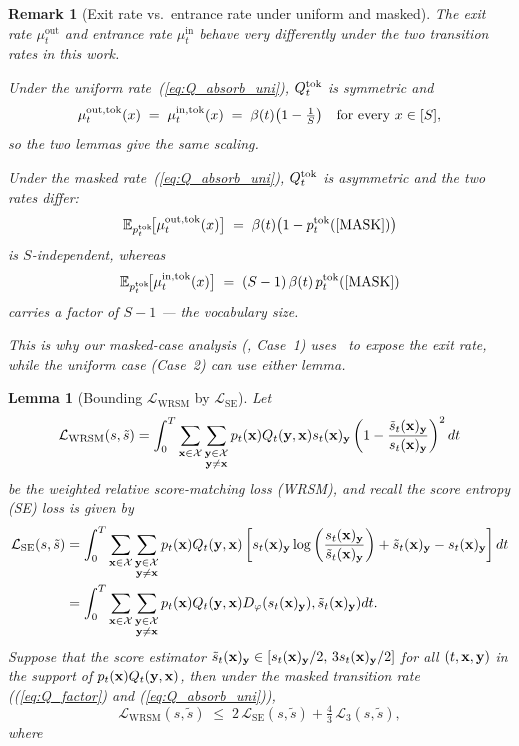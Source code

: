 \documentclass{article} %
\newtheorem{lemma}[theorem]{Lemma}
\newtheorem{remark}[theorem]{Remark}
\def\eqref#1{equation~\ref{#1}}
\newcommand{\bfx}{{\bf x}}
\newcommand{\bfy}{ {\bf y}}
\newcommand{\mask}{\text{[MASK]}}
\newcommand{\LWRSM}{\mathcal{L}_{\mathrm{WRSM}}}
\newcommand{\LSE}{\mathcal{L}_{\mathrm{SE}}}
\renewcommand{\eqref}[1]{\textup{(\ref{#1})}}
\newcommand{\LThree}{\mathcal{L}_{3}}
\begin{document}
\begin{remark}[Exit rate vs.\ entrance rate under uniform and masked]
The exit rate $\mu^\mathrm{out}_t$ and entrance rate $\mu^\mathrm{in}_t$ behave very differently 
under the two transition rates in this work.



\noindent Under the uniform rate~\eqref{eq:Q_absorb_uni}, $Q_t^{\rm tok}$ is symmetric and
\[
  \mu_t^{\rm out, tok}(x) \;=\; \mu_t^{\rm in, tok}(x) \;=\; \beta(t)\bigl(1 - \tfrac{1}{S}\bigr)
  \quad \text{for every } x \in [S],
\]
so the two lemmas give the same scaling.

\smallskip
\noindent Under the masked rate~\eqref{eq:Q_absorb_uni}, $Q_t^{\rm tok}$ is 
asymmetric and the two rates differ:
\[
  \mathbb{E}_{p_t^{\rm tok}}\!\bigl[\mu_t^{\rm out, tok}(x)\bigr] 
  \;=\; \beta(t)\bigl(1 - p_t^{\rm tok}(\mask)\bigr)
\]
is $S$-independent, whereas
\[
  \mathbb{E}_{p_t^{\rm tok}}\!\bigl[\mu_t^{\rm in, tok}(x)\bigr] 
  \;=\; (S-1)\,\beta(t)\,p_t^{\rm tok}(\mask)
\]
carries a factor of $S-1$ — the vocabulary size.


\smallskip
\noindent This is why our masked-case analysis (, Case~1) 
uses~ to expose the exit rate, while the 
uniform case (Case~2) can use either lemma.
\end{remark}


\begin{lemma}[Bounding $\LWRSM$ by $\LSE$]\label{lemma:LWRSM_SE}
    Let
    \begin{equation}\label{eq:LWRSM}
        \LWRSM(s, \tilde{s}) = \int_0^T \sum_{\substack{\bfx\in\mathcal{X}}} \sum_{\substack{\bfy\in\mathcal{X} \\ \bfy\neq \bfx}} p_t(\bfx) Q_t(\bfy, \bfx) s_t(\bfx)_\bfy \left( 1 - \frac{\tilde{s}_t(\bfx)_\bfy}{s_t(\bfx)_\bfy} \right) ^2  dt
    \end{equation}
    be the weighted relative score-matching loss (WRSM), and recall the score entropy (SE) loss is given by
    \begin{align*}
        \LSE(s, \tilde{s})&=\int_0^T \sum_{\substack{\bfx\in\mathcal{X}}} \sum_{\substack{\bfy\in\mathcal{X} \\ \bfy\neq \bfx}} p_t(\bfx)  Q_t(\bfy, \bfx) \left[ s_t(\bfx)_\bfy \log\left(\frac{s_t(\bfx)_\bfy}{\tilde{s}_t(\bfx)_\bfy}\right) + \tilde{s}_t(\bfx)_\bfy - s_t(\bfx)_\bfy \right] dt\\
        &=\int_0^T \sum_{\substack{\bfx\in\mathcal{X}}} \sum_{\substack{\bfy\in\mathcal{X} \\ \bfy\neq \bfx}} p_t(\bfx)  Q_t(\bfy, \bfx) D_\varphi(s_t(\bfx)_\bfy), \tilde{s}_t(\bfx)_\bfy) dt.
    \end{align*}
    Suppose that the score estimator
$\tilde s_t(\bfx)_\bfy \in [s_t(\bfx)_\bfy/2,\,3 s_t(\bfx)_\bfy/2]$
for all $(t, \bfx, \bfy)$ in the support of $p_t(\bfx) Q_t(\bfy, \bfx)$, then under the masked transition rate (\eqref{eq:Q_factor} and \eqref{eq:Q_absorb_uni}),
\begin{equation}
\LWRSM(s, \tilde{s}) \;\le\; 2\,\LSE(s, \tilde{s}) + \tfrac{4}{3}\,\LThree(s, \tilde{s}),
\label{eq:LWRSM-LSE}
\end{equation}
where
\myfcases
\end{lemma}
\end{document}
